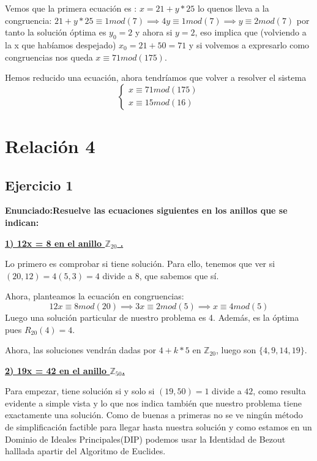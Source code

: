 \documentclass[11pt, a4paper, titlepage]{article}
\providecommand{\ent}{\mathbb{Z}}
\begin{document}
Vemos que la primera ecuación es : $x = 21+y*25$ lo quenos lleva a la congruencia: $21 +y*25 \equiv 1 mod(7) \implies 4y \equiv 1 mod(7) \implies y \equiv 2 mod(7)$ por tanto la solución óptima es $y_0 = 2$ y ahora si $y=2$, eso implica que (volviendo a la x que habíamos despejado) $x_0 = 21+50 = 71$ y si volvemos a expresarlo como congruencias nos queda $x \equiv 71 mod(175)$. 

Hemos reducido una ecuación, ahora tendríamos que volver a resolver el sistema
\[
\begin{cases}
	x \equiv 71 mod(175)\\
	x \equiv 15 mod(16)
\end{cases}
\]






\pagebreak
\section{\Huge{Relación 4}}



\subsection{ \LARGE{Ejercicio 1}}

\textbf{Enunciado:Resuelve las ecuaciones siguientes en los anillos que se indican:}

\underline{\textbf{1) 12x = 8 en el anillo $\ent_{20}$ .}}

Lo primero es comprobar si tiene solución. Para ello, tenemos que ver si $(20,12) = 4(5,3) = 4$ divide a 8, que sabemos que sí.

Ahora, planteamos la ecuación en congruencias:
	\[
	12x \equiv 8 mod(20) \implies 3x \equiv 2 mod(5) \implies x \equiv 4 mod(5)
	\]
Luego una solución particular de nuestro problema es 4. Además, es la óptima pues $R_{20}(4) = 4$.

Ahora, las soluciones vendrán dadas por $4+k*5$ en $\ent_{20}$, luego son $\{4,9,14,19\}$.

\underline{\textbf{2) 19x = 42 en el anillo $\ent_{50}$.}}

Para empezar, tiene solución si y solo si $(19,50)=1$ divide a $42$, como resulta evidente a simple vista y lo que nos indica también que nuestro problema tiene exactamente una solución. Como de buenas a primeras no se ve ningún método de simplificación factible para llegar hasta nuestra solución y como estamos en un Dominio de Ideales Principales(DIP) podemos usar la Identidad de Bezout halllada apartir del Algoritmo de Euclides.
\end{document}
